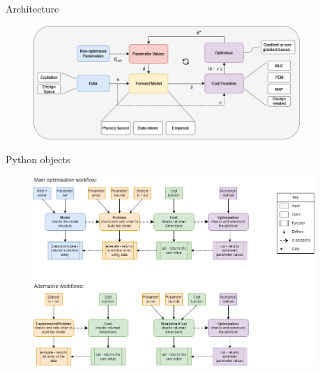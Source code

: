 \documentclass[aspectratio=169]{beamer}
\begin{document}
\begin{frame}{Architecture}
    \vspace{-6mm}
    \begin{figure}
        \centering
        \includegraphics[width=0.9\textwidth]{Images/Diagrams/pybop_architecture.png}
        \label{fig:architecture}
    \end{figure}
\end{frame}

\begin{frame}{Python objects}
    \vspace{-6mm}
    \begin{figure}
        \centering
        \includegraphics[width=0.95\textwidth, trim={0 10cm 0 0},clip]{Images/Diagrams/pybop_objects.png}
        \label{fig:objects}
    \end{figure}
\end{frame}
\end{document}
